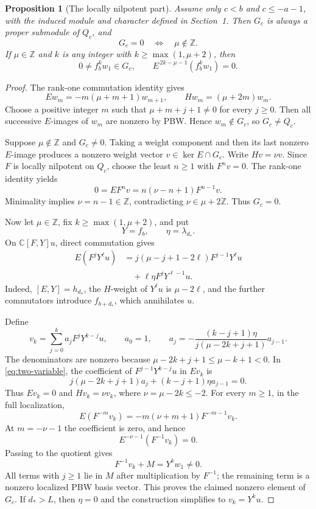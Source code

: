 \documentclass[11pt,a4paper]{article}
\newcommand{\C}{\mathbb C}
\newcommand{\Z}{\mathbb Z}
\theoremstyle{plainupright}
\newtheorem{proposition}[theorem]{Proposition}
\begin{document}
\begin{proposition}[The locally nilpotent part]\label{prop:G}
Assume only \(c<b\) and \(c\le-a-1\), with the induced module and
character defined in Section~1. Then \(G_c\) is always a proper
submodule of \(Q_c\), and
\[
G_c=0\quad\Longleftrightarrow\quad \mu\notin\Z.
\]
If \(\mu\in\Z\) and \(k\) is any integer with
\(k\ge\max(1,\mu+2)\), then
\[
0\ne f_b^kw_1\in G_c,\qquad
E^{\,2k-\mu-1}(f_b^kw_1)=0.
\]
\end{proposition}
\begin{proof}
The rank-one commutation identity gives
\begin{equation}\label{eq:pure-recursion}
Ew_m=-m(\mu+m+1)w_{m+1},\qquad Hw_m=(\mu+2m)w_m.
\end{equation}
Choose a positive integer \(m\) such that
\(\mu+m+j+1\ne0\) for every \(j\ge0\).
Then all successive \(E\)-images of \(w_m\) are nonzero by PBW.
Hence \(w_m\notin G_c\), so \(G_c\ne Q_c\).

Suppose \(\mu\notin\Z\) and \(G_c\ne0\).
Taking a weight component and then its last nonzero \(E\)-image
produces a nonzero weight vector \(v\in\ker E\cap G_c\).
Write \(Hv=\nu v\). Since \(F\) is locally nilpotent on \(Q_c\),
choose the least \(n\ge1\) with \(F^nv=0\).
The rank-one identity yields
\[
0=EF^nv=n(\nu-n+1)F^{n-1}v.
\]
Minimality implies \(\nu=n-1\in\Z\), contradicting
\(\nu\in\mu+2\Z\). Thus \(G_c=0\).

Now let \(\mu\in\Z\), fix \(k\ge\max(1,\mu+2)\), and put
\[
Y=f_b,\qquad \eta=\lambda_{d_*}.
\]
On \(\C[F,Y]u\), direct commutation gives
\begin{equation}\label{eq:two-variable}
\begin{aligned}
E(F^jY^\ell u)
&=j(\mu-j+1-2\ell)F^{j-1}Y^\ell u\\
&\quad+\ell\eta F^jY^{\ell-1}u.
\end{aligned}
\end{equation}
Indeed, \([E,Y]=h_{d_*}\), the \(H\)-weight of \(Y^\ell u\) is
\(\mu-2\ell\), and the further commutators introduce
\(f_{b+d_*}\), which annihilates \(u\).

Define
\[
v_k=\sum_{j=0}^k a_jF^jY^{k-j}u,\qquad a_0=1,\qquad
a_j=-\frac{(k-j+1)\eta}{j(\mu-2k+j+1)}a_{j-1}.
\]
The denominators are nonzero because
\(\mu-2k+j+1\le\mu-k+1<0\).
In \eqref{eq:two-variable}, the coefficient of
\(F^{j-1}Y^{k-j}u\) in \(Ev_k\) is
\[
j(\mu-2k+j+1)a_j+(k-j+1)\eta a_{j-1}=0.
\]
Thus \(Ev_k=0\) and \(Hv_k=\nu v_k\), where \(\nu=\mu-2k\le-2\).
For every \(m\ge1\), in the full localization,
\[
E(F^{-m}v_k)=-m(\nu+m+1)F^{-m-1}v_k.
\]
At \(m=-\nu-1\) the coefficient is zero, and hence
\[
E^{-\nu-1}(F^{-1}v_k)=0.
\]
Passing to the quotient gives
\[
F^{-1}v_k+M=Y^kw_1\ne0.
\]
All terms with \(j\ge1\) lie in \(M\) after multiplication by \(F^{-1}\);
the remaining term is a nonzero localized PBW basis vector.
This proves the claimed nonzero element of \(G_c\).
If \(d_*>L\), then \(\eta=0\) and the construction simplifies to
\(v_k=Y^ku\).
\end{proof}
\end{document}
